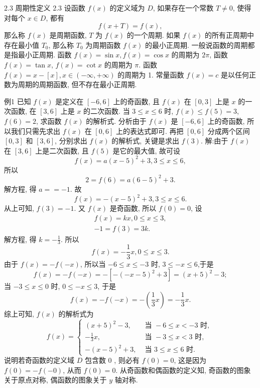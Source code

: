2.3 周期性定义 2.3 设函数 $f(x)$ 的定义域为 $D$, 如果存在一个常数 $T \neq 0$, 使得对每个 $x \in D$, 都有
$$
f(x+T)=f(x),
$$
那么称 $f(x)$ 是周期函数, $T$ 为 $f(x)$ 的一个周期.
如果 $f(x)$ 的所有正周期中存在最小值 $T_0$, 那么称 $T_0$ 为周期函数 $f(x)$ 的最小正周期.
一般说函数的周期都是指最小正周期.
函数 $f(x)=\sin x, f(x)=\cos x$ 的周期为 $2 \pi$, 函数 $f(x)=\tan x$, $f(x)=\cot x$ 的周期为 $\pi$. 函数 $f(x)=x-[x], x \in(-\infty,+\infty)$ 的周期为 1. 常量函数 $f(x)=c$ 是以任何正数为周期的周期函数, 但不存在最小正周期.



例1 已知 $f(x)$ 是定义在 $[-6,6]$ 上的奇函数, 且 $f(x)$ 在 $[0,3]$ 上是 $x$ 的一次函数, 在 $[3,6]$ 上是 $x$ 的二次函数.
当 $3 \leqslant x \leqslant 6$ 时, $f(x) \leqslant f(5)=3$, $f(6)=2$, 求函数 $f(x)$ 的解析式.
分析由于 $f(x)$ 是 $[-6,6]$ 上的奇函数, 所以我们只需先求出 $f(x)$ 在 $[0,6]$ 上的表达式即可.
再把 $[0,6]$ 分成两个区间 $[0,3]$ 和 $[3,6]$, 分别求出 $f(x)$ 的解析式, 关键是求出 $f(3)$.
解:由于 $f(x)$ 在 $[3,6]$ 上是二次函数, 且 $f(5)$ 是它的最大值, 故可设
$$
f(x)=a(x-5)^2+3,3 \leqslant x \leqslant 6,
$$
所以
$$
2=f(6)=a(6-5)^2+3 .
$$
解方程, 得 $a==-1$.
故
$$
f(x)=-(x-5)^2+3,3 \leqslant x \leqslant 6 .
$$
从上可知, $f(3)=-1$. 又 $f(x)$ 是奇函数, 所以 $f(0)=0$, 设
$$
\begin{gathered}
f(x)=k x, 0 \leqslant x \leqslant 3, \\
-1=f(3)=3 k .
\end{gathered}
$$
解方程, 得 $k=-\frac{1}{3}$.
所以
$$
f(x)=-\frac{1}{3} x, 0 \leqslant x \leqslant 3 .
$$
由于 $f(x)=-f(-x)$, 所以当 $-6 \leqslant x \leqslant-3$ 时, $3 \leqslant-x \leqslant 6$,于是
$$
f(x)=-f(-x)=-\left[-(-x-5)^2+3\right]=(x+5)^2-3 ;
$$
当 $-3 \leqslant x \leqslant 0$ 时, $0 \leqslant-x \leqslant 3$, 于是
$$
f(x)=-f(-x)=-\left(\frac{1}{3} x\right)=-\frac{1}{3} x .
$$
综上可知, $f(x)$ 的解析式为
$$
f(x)= \begin{cases}(x+5)^2-3, & \text { 当 }-6 \leqslant x<-3 \text { 时, } \\ -\frac{1}{3} x, & \text { 当 }-3 \leqslant x<3 \text { 时, } \\ -(x-5)^2+3, & \text { 当 } 3 \leqslant x \leqslant 6 \text { 时.
}\end{cases}
$$
说明若奇函数的定义域 $D$ 包含数 0 , 则必有 $f(0)=0$, 这是因为 $f(0)=-f(-0)$, 从而 $f(0)=0$.
从奇函数和偶函数的定义知, 奇函数的图象关于原点对称, 偶函数的图象关于 $y$ 轴对称.



